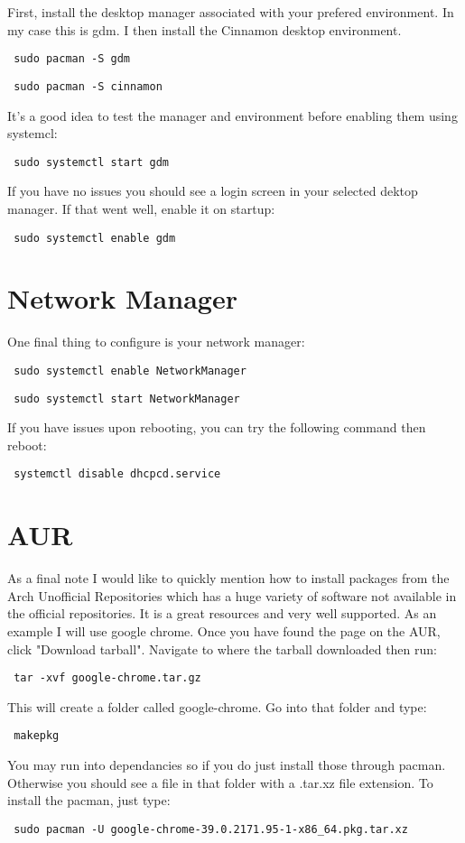 \documentclass[12pt]{article}
\begin{document}
    First, install the desktop manager associated with your prefered
    environment. In my case this is gdm. I then install the Cinnamon desktop
    environment.
    \begin{verbatim} sudo pacman -S gdm \end{verbatim}
    \begin{verbatim} sudo pacman -S cinnamon \end{verbatim}
    It's a good idea to test the manager and environment before enabling them
    using systemcl:
    \begin{verbatim} sudo systemctl start gdm \end{verbatim}
    If you have no issues you should see a login screen in your selected dektop
    manager. If that went well, enable it on startup:
    \begin{verbatim} sudo systemctl enable gdm \end{verbatim}

\section*{Network Manager}
    One final thing to configure is your network manager:
    \begin{verbatim} sudo systemctl enable NetworkManager \end{verbatim}
    \begin{verbatim} sudo systemctl start NetworkManager \end{verbatim}
    If you have issues upon rebooting, you can try the following command then
    reboot:
    \begin{verbatim} systemctl disable dhcpcd.service \end{verbatim}

\section*{AUR}
    As a final note I would like to quickly mention how to install packages
    from the Arch Unofficial Repositories which has a huge variety of software
    not available in the official repositories. It is a great resources and
    very well supported.
    As an example I will use google chrome. Once you have found the page on the
    AUR, click "Download tarball". Navigate to where the tarball downloaded
    then run:
    \begin{verbatim} tar -xvf google-chrome.tar.gz \end{verbatim}
    This will create a folder called google-chrome. Go into that folder and
    type:
    \begin{verbatim} makepkg \end{verbatim}
    You may run into dependancies so if you do just install those through
    pacman. Otherwise you should see a file in that folder with a .tar.xz file
    extension. To install the pacman, just type:
    \begin{verbatim} sudo pacman -U google-chrome-39.0.2171.95-1-x86_64.pkg.tar.xz \end{verbatim}
\end{document}
